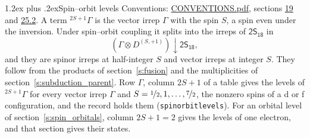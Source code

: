 \documentclass[10pt,a4paper]{article}
\makeatletter
\renewcommand\section{\@startsection{section}{1}{\z@}{-3ex plus -1ex minus -.2ex}%
  {1.2ex plus .2ex}{\normalfont\large\sffamily\bfseries\color{parttitle}}}
\numberwithin{equation}{section}
\newcommand{\grp}[1]{\mathsf{#1}}
\newcommand{\restr}[2]{#1\!\downarrow#2}
\newcommand{\irrJp}[2]{D^{(#1,#2)}}
\newcommand{\irrprod}{\otimes}
\newcommand{\term}[2]{{}^{#1}#2}
\makeatother
\begin{document}
\section{Spin--orbit levels}\label{s:spin_orbit}
Conventions: \href{../../CONVENTIONS.pdf}{CONVENTIONS.pdf}, sections \href{../../../rotation/CONVENTIONS.pdf\#conv.19}{19} and \href{../../CONVENTIONS.pdf\#conv.25.2}{25.2}.
\leavevmode\label{n:local.spin}\label{n:symbol.term}A term $\term{2S+1}{\Gamma}$ is the vector irrep $\Gamma$ with the spin $S$, a spin even under the inversion. Under spin--orbit coupling it splits into the irreps of $\grp{2S_{18}}$ in
\begin{equation}\label{e:spinorbit}\restr{(\Gamma \irrprod \irrJp{S}{+1})}{\grp{2S_{18}}},\end{equation}
and they are spinor irreps at half-integer $S$ and vector irreps at integer $S$. They follow from the products of section~\ref{s:fusion} and the multiplicities of section~\ref{s:subduction_parent}. Row $\Gamma$, column $2S + 1$ of a table gives the levels of $\term{2S+1}{\Gamma}$ for every vector irrep $\Gamma$ and $S = \nicefrac{1}{2}, 1, \dots, \nicefrac{7}{2}$, the nonzero spins of a d or f configuration, and the record holds them (\texttt{spinorbitlevels}). For an orbital level of section~\ref{s:spin_orbitals}, column $2S + 1 = 2$ gives the levels of one electron, and that section gives their states.
\end{document}
